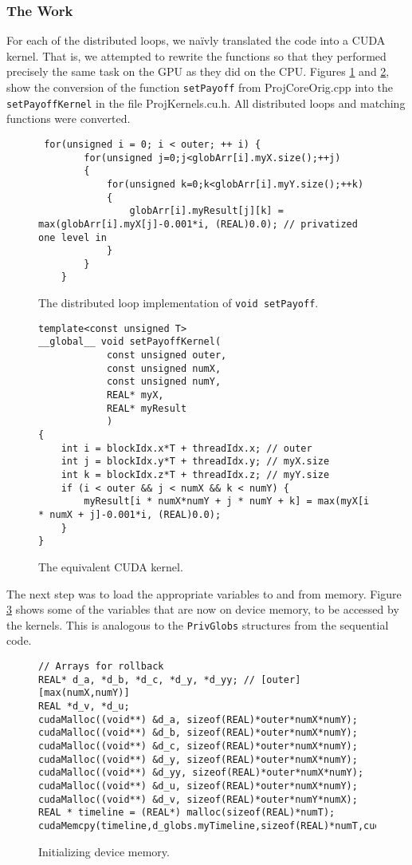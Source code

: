\documentclass[12pt, oneside]{article}
\begin{document}
\subsubsection{The Work}
For each of the distributed loops, we na\"ivly translated the code into a CUDA kernel. That is, we attempted to rewrite the functions so that they performed precisely the same task on the GPU as they did on the CPU. Figures \ref{fig:nokernel} and \ref{fig:yeskernel}, show the conversion of the function \texttt{setPayoff} from ProjCoreOrig.cpp into the \texttt{setPayoffKernel} in the file ProjKernels.cu.h. All distributed loops and matching functions were converted.
\begin{figure}[h]
	\begin{lstlisting}
 for(unsigned i = 0; i < outer; ++ i) {
        for(unsigned j=0;j<globArr[i].myX.size();++j)
        {
            for(unsigned k=0;k<globArr[i].myY.size();++k)
            {
                globArr[i].myResult[j][k] = max(globArr[i].myX[j]-0.001*i, (REAL)0.0); // privatized one level in
            }
        }
    }
\end{lstlisting}
\caption{ \label{fig:nokernel} The distributed loop implementation of \texttt{void setPayoff}.}
\end{figure}
\begin{figure}[h]
\begin{lstlisting}
template<const unsigned T>
__global__ void setPayoffKernel(
			const unsigned outer,
			const unsigned numX,
			const unsigned numY,
			REAL* myX,
			REAL* myResult
			)
{
	int i = blockIdx.x*T + threadIdx.x; // outer
	int j = blockIdx.y*T + threadIdx.y; // myX.size
	int k = blockIdx.z*T + threadIdx.z; // myY.size
	if (i < outer && j < numX && k < numY) {
		myResult[i * numX*numY + j * numY + k] = max(myX[i * numX + j]-0.001*i, (REAL)0.0);
	}
}
\end{lstlisting}
\caption{ \label{fig:yeskernel} The equivalent CUDA kernel.}
\end{figure}
					
The next step was to load the appropriate variables to and from memory. Figure \ref{fig:cudamemcopy} shows some of the variables that are now on device memory, to be accessed by the kernels. This is analogous to the \texttt{PrivGlobs} structures from the sequential code.
					
\begin{figure}[h]
\begin{lstlisting}
// Arrays for rollback
REAL* d_a, *d_b, *d_c, *d_y, *d_yy; // [outer][max(numX,numY)]
REAL *d_v, *d_u;
cudaMalloc((void**) &d_a, sizeof(REAL)*outer*numX*numY);
cudaMalloc((void**) &d_b, sizeof(REAL)*outer*numX*numY);
cudaMalloc((void**) &d_c, sizeof(REAL)*outer*numX*numY);
cudaMalloc((void**) &d_y, sizeof(REAL)*outer*numX*numY);
cudaMalloc((void**) &d_yy, sizeof(REAL)*outer*numX*numY);
cudaMalloc((void**) &d_u, sizeof(REAL)*outer*numX*numY);
cudaMalloc((void**) &d_v, sizeof(REAL)*outer*numY*numX);
REAL * timeline = (REAL*) malloc(sizeof(REAL)*numT);
cudaMemcpy(timeline,d_globs.myTimeline,sizeof(REAL)*numT,cudaMemcpyDeviceToHost);
\end{lstlisting}
\caption{ \label{fig:cudamemcopy} Initializing device memory.}
\end{figure}
						
\end{document}
